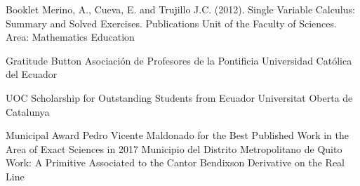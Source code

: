 \documentclass[
    a4paper,
    maincolor=cvblue!70!blue,
    sidecolor=gray!30,
    sectioncolor=cvblue!70!blue,
    sidebarwidth=7.5cm,
    topbottommargin=20pt,
    leftrightmargin=20pt,
]{fortysecondscv}
\begin{document}
    {Booklet}
    {Merino, A., Cueva, E. and Trujillo J.C. (2012). Single Variable Calculus: Summary and Solved Exercises. Publications Unit of the Faculty of Sciences.}
    {}
    {Area: Mathematics Education}
    


    {Gratitude Button}
    {Asociación de Profesores de la Pontificia Universidad Católica del Ecuador}
    {}

    {UOC Scholarship for Outstanding Students from Ecuador}
    {Universitat Oberta de Catalunya}
    {}
    
    {Municipal Award Pedro Vicente Maldonado for the Best Published Work in the Area of Exact Sciences in 2017}
    {Municipio del Distrito Metropolitano de Quito}
    {Work: A Primitive Associated to the Cantor Bendixson Derivative on the Real Line}
    

\end{document}
